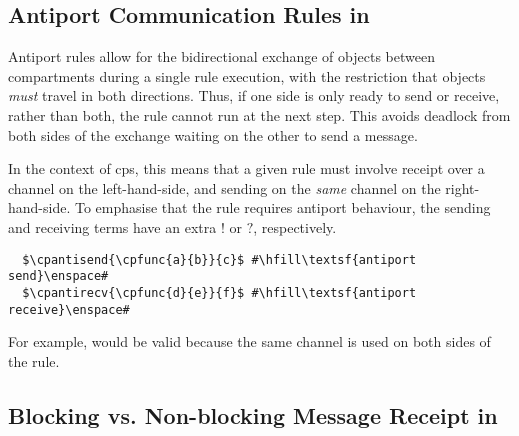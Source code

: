 \subsection{\label{sec:cps:antiport}Antiport Communication Rules in }


Antiport rules \cite{Orellana-Martin2019,Paun2002} allow for the bidirectional exchange of objects between \glspl{compartment} during a single rule execution, with the restriction that objects \emph{must} travel in both directions.  Thus, if one side is only ready to send or receive, rather than both, the rule cannot run at the next step.  This avoids deadlock from both sides of the exchange waiting on the other to send a message.

In the context of \gls{cps}, this means that a given rule must involve receipt over a channel on the left-hand-side, and sending on the \emph{same} channel on the right-hand-side.  To emphasise that the rule requires antiport behaviour, the sending and receiving terms have an extra \(!\) or \(?\), respectively.

\lstset{xleftmargin=.5in, xrightmargin=.5in} 
\begin{lstlisting}
  $\cpantisend{\cpfunc{a}{b}}{c}$ #\hfill\textsf{antiport send}\enspace#
  $\cpantirecv{\cpfunc{d}{e}}{f}$ #\hfill\textsf{antiport receive}\enspace#
\end{lstlisting}

For example,  would be valid because the same channel is used on both sides of the rule.

\subsection{\label{sec:cps:blocking}Blocking vs. Non-blocking Message Receipt in }

